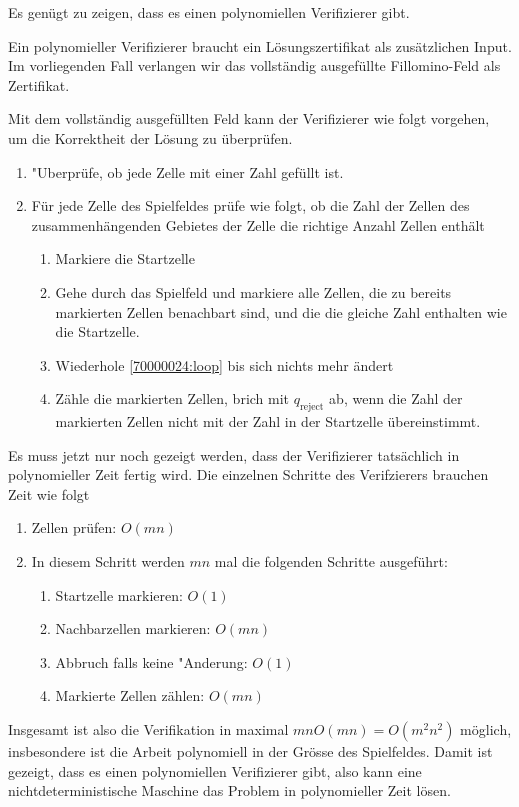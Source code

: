 \begin{loesung}
Es genügt zu zeigen, dass es einen polynomiellen Verifizierer gibt.

Ein polynomieller Verifizierer braucht ein Lösungszertifikat als 
zusätzlichen Input. Im vorliegenden Fall verlangen wir das vollständig
ausgefüllte Fillomino-Feld als Zertifikat.

Mit dem vollständig ausgefüllten Feld kann der Verifizierer wie folgt
vorgehen, um die Korrektheit der Lösung zu überprüfen.
\begin{enumerate}
\item "Uberprüfe, ob jede Zelle mit einer Zahl gefüllt ist.
\item Für jede Zelle des Spielfeldes prüfe wie folgt, ob die Zahl der
Zellen des zusammenhängenden Gebietes der Zelle die richtige Anzahl
Zellen enthält
\begin{enumerate}
\item Markiere die Startzelle
\item \label{70000024:loop} Gehe durch das Spielfeld und markiere alle Zellen, die zu bereits
markierten Zellen benachbart sind, und die die gleiche Zahl enthalten wie
die Startzelle.
\item Wiederhole \ref{70000024:loop} bis sich nichts mehr ändert
\item Zähle die markierten Zellen, brich mit $q_{\text{reject}}$ ab,
wenn die Zahl der markierten Zellen nicht mit der Zahl in der Startzelle
übereinstimmt.
\end{enumerate}
\end{enumerate}
Es muss jetzt nur noch gezeigt werden, dass der Verifizierer tatsächlich
in polynomieller Zeit fertig wird. Die einzelnen Schritte des Verifzierers
brauchen Zeit wie folgt
\begin{enumerate}
\item Zellen prüfen: $O(mn)$
\item In diesem Schritt werden $mn$ mal die folgenden Schritte ausgeführt:
\begin{enumerate}
\item Startzelle markieren: $O(1)$
\item Nachbarzellen markieren: $O(mn)$
\item Abbruch falls keine "Anderung: $O(1)$
\item Markierte Zellen zählen: $O(mn)$
\end{enumerate}
\end{enumerate}
Insgesamt ist also die Verifikation in maximal $mnO(mn)=O(m^2n^2)$ möglich,
insbesondere ist die Arbeit polynomiell in der Grösse des Spielfeldes.
Damit ist gezeigt, dass es einen polynomiellen Verifizierer gibt,
also kann eine nichtdeterministische Maschine das Problem in polynomieller
Zeit lösen.
\end{loesung}

